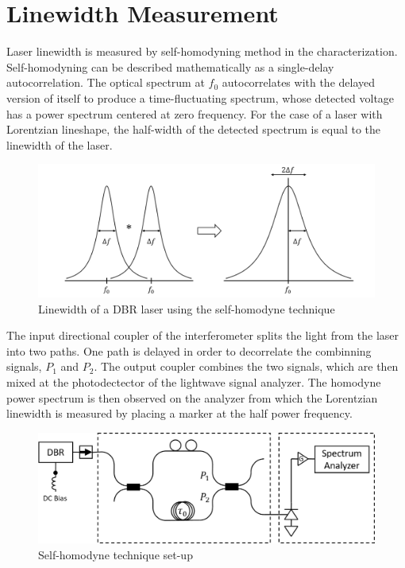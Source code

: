 \section{Linewidth Measurement}\label{sec:linewidth_measurement}
Laser linewidth is measured by self-homodyning method in the characterization. Self-homodyning can be described mathematically as a single-delay autocorrelation. The optical spectrum at $f_0$ autocorrelates with the delayed version of itself to produce a time-fluctuating spectrum, whose detected voltage has a power spectrum centered at zero frequency. For the case of a laser with Lorentzian lineshape, the half-width of the detected spectrum is equal to the linewidth of the laser.
\begin{figure}[ht]
    \centering
    \includegraphics[width=.7\linewidth]{figures/self-homodyne.png}
    \caption{Linewidth of a DBR laser using the self-homodyne technique}
    \label{self-homodyne}
\end{figure}

The input directional coupler of the interferometer splits the light from the laser into two paths. One path is delayed in order to decorrelate the combinning signals, $P_1$ and $P_2$. The output coupler combines the two signals, which are then mixed at the photodectector of the lightwave signal analyzer.  The homodyne power spectrum is then observed on the analyzer from which the Lorentzian linewidth is measured by placing a marker at the half power frequency.
\begin{figure}[ht]
    \centering
    \includegraphics[width=.7\linewidth]{figures/self-homodyne_setup.png}
    \caption{Self-homodyne technique set-up}
    \label{self-homodyne_setup}
\end{figure}

